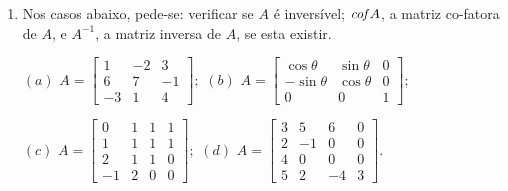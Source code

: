 \documentclass{report}
\begin{document}
\begin{Exercise}
\begin{enumerate}

\item \label{1lista37} Nos casos abaixo, pede-se: verificar se $A$
é inversível;  ${\it cof}A$, a matriz co-fatora de $A$, e
$A^{-1}$, a matriz inversa de $A$, se esta existir.

\medskip

$(a)$ $A=\left[
\begin{array}{rrr}
1 & -2 & 3 \\
6 & 7 & -1 \\
-3 & 1 & 4
\end{array}
\right];$ \hspace{1.5cm} $(b)$ $A=\left[
\begin{array}{rrr}
\cos \theta  & \sin \theta  & 0 \\
-\sin\theta  & \cos \theta  & 0 \\
0 & 0 & 1
\end{array}
\right];$

\bigskip

$(c)$ $A=\left[
\begin{array}{rrrr}
0 & 1 & 1 & 1 \\
1 & 1 & 1 & 1 \\
2 & 1 & 1 & 0 \\
-1 & 2 & 0 & 0
\end{array}
\right];$  \hspace{1.5cm}  $(d)$ $A=\left[
\begin{array}{rrrr}
3 & 5 & 6 & 0 \\
2 & -1 & 0 & 0 \\
4 & 0 & 0 & 0 \\
5 & 2 & -4 & 3
\end{array}
\right].$








\end{enumerate}
\end{Exercise}
\end{document}
